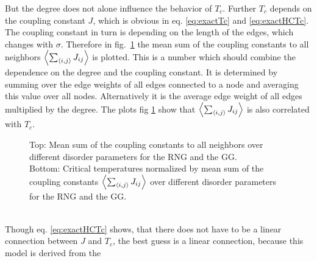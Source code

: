     But the degree does not alone influence the behavior of \(T_c\).
    Further \(T_c\) depends on the coupling constant \(J\), which is
    obvious in eq. \eqref{eq:exactTc} and \eqref{eq:exactHCTc}. The
    coupling constant in turn is depending on the length of the edges,
    which changes with \(\sigma\).
    Therefore  in fig.\ \ref{fig:TcJ}
    the mean sum of the coupling constants to all neighbors \(\left< \sum_{\left< i,j \right>} J_{ij} \right>\)
    is plotted. This is a number which should combine the dependence on
    the degree and the coupling constant. It is determined by summing
    over the edge weights of all edges connected to a node and averaging
    this value over all nodes. Alternatively it is the average edge weight
    of all edges multiplied by the degree.
    The plots fig \ref{fig:TcJ}
    show that \(\left< \sum_{\left< i,j \right>} J_{ij} \right>\) is also correlated with \(T_c\).
    \begin{figure}[htbp]
        \centering


        \caption[Critical Temperature Normalized by Mean Sum of the Coupling Constants]
        {
            Top: Mean sum of the coupling constants to all
            neighbors over different disorder parameters for
             the RNG and
             the GG.\\
            Bottom: Critical temperatures normalized by mean sum of the
            coupling constants \(\left< \sum_{\left< i,j \right>} J_{ij} \right>\) over different
            disorder parameters for
             the RNG and
             the GG.
        }
        \label{fig:TcJ}
    \end{figure}\\
    Though eq. \eqref{eq:exactHCTc} shows, that there does not have
    to be a linear connection between \(J\) and \(T_c\), the best guess
    is a linear connection, because this model is derived from the
